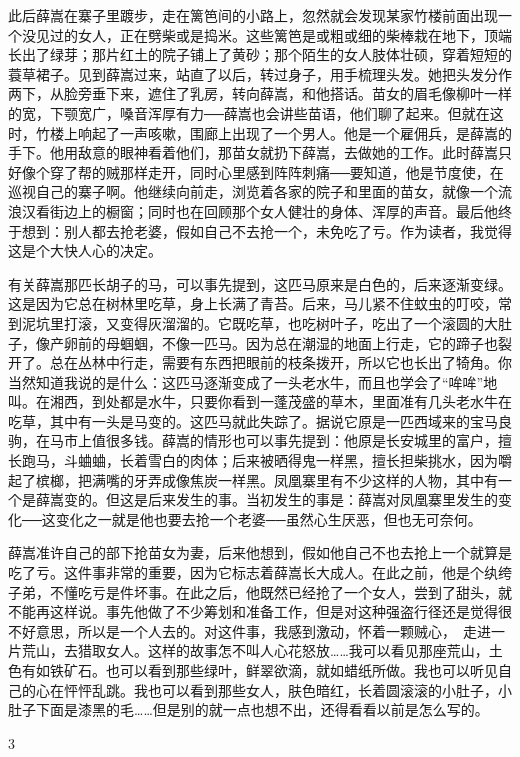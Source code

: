 此后薛嵩在寨子里踱步，走在篱笆间的小路上，忽然就会发现某家竹楼前面出现一个没见过的女人，正在劈柴或是捣米。这些篱笆是或粗或细的柴棒栽在地下，顶端长出了绿芽；那片红土的院子铺上了黄砂；那个陌生的女人肢体壮硕，穿着短短的蓑草裙子。见到薛嵩过来，站直了以后，转过身子，用手梳理头发。她把头发分作两下，从脸旁垂下来，遮住了乳房，转向薛嵩，和他搭话。苗女的眉毛像柳叶一样的宽，下颚宽广，嗓音浑厚有力──薛嵩也会讲些苗语，他们聊了起来。但就在这时，竹楼上响起了一声咳嗽，围廊上出现了一个男人。他是一个雇佣兵，是薛嵩的手下。他用敌意的眼神看着他们，那苗女就扔下薛嵩，去做她的工作。此时薛嵩只好像个穿了帮的贼那样走开，同时心里感到阵阵刺痛──要知道，他是节度使，在巡视自己的寨子啊。他继续向前走，浏览着各家的院子和里面的苗女，就像一个流浪汉看街边上的橱窗；同时也在回顾那个女人健壮的身体、浑厚的声音。最后他终于想到：别人都去抢老婆，假如自己不去抢一个，未免吃了亏。作为读者，我觉得这是个大快人心的决定。 

有关薛嵩那匹长胡子的马，可以事先提到，这匹马原来是白色的，后来逐渐变绿。这是因为它总在树林里吃草，身上长满了青苔。后来，马儿紧不住蚊虫的叮咬，常到泥坑里打滚，又变得灰溜溜的。它既吃草，也吃树叶子，吃出了一个滚圆的大肚子，像产卵前的母蝈蝈，不像一匹马。因为总在潮湿的地面上行走，它的蹄子也裂开了。总在丛林中行走，需要有东西把眼前的枝条拨开，所以它也长出了犄角。你当然知道我说的是什么：这匹马逐渐变成了一头老水牛，而且也学会了“哞哞”地叫。在湘西，到处都是水牛，只要你看到一蓬茂盛的草木，里面准有几头老水牛在吃草，其中有一头是马变的。这匹马就此失踪了。据说它原是一匹西域来的宝马良驹，在马市上值很多钱。薛嵩的情形也可以事先提到：他原是长安城里的富户，擅长跑马，斗蛐蛐，长着雪白的肉体；后来被晒得鬼一样黑，擅长担柴挑水，因为嚼起了槟榔，把满嘴的牙弄成像焦炭一样黑。凤凰寨里有不少这样的人物，其中有一个是薛嵩变的。但这是后来发生的事。当初发生的事是：薛嵩对凤凰寨里发生的变化──这变化之一就是他也要去抢一个老婆──虽然心生厌恶，但也无可奈何。 

薛嵩准许自己的部下抢苗女为妻，后来他想到，假如他自己不也去抢上一个就算是吃了亏。这件事非常的重要，因为它标志着薛嵩长大成人。在此之前，他是个纨绔子弟，不懂吃亏是件坏事。在此之后，他既然已经抢了一个女人，尝到了甜头，就不能再这样说。事先他做了不少筹划和准备工作，但是对这种强盗行径还是觉得很不好意思，所以是一个人去的。对这件事，我感到激动，怀着一颗贼心，　走进一片荒山，去猎取女人。这样的故事怎不叫人心花怒放……我可以看见那座荒山，土色有如铁矿石。也可以看到那些绿叶，鲜翠欲滴，就如蜡纸所做。我也可以听见自己的心在怦怦乱跳。我也可以看到那些女人，肤色暗红，长着圆滚滚的小肚子，小肚子下面是漆黑的毛……但是别的就一点也想不出，还得看看以前是怎么写的。 

3 


